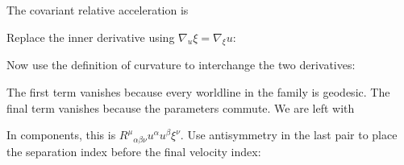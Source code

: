 \documentclass[
  11pt,
  letterpaper,
  oneside,
  openany]{scrbook}
\begin{document}
The covariant relative acceleration is

\begin{center}
\begingroup
{}
\ifdim\wd\grmathbox>\linewidth
\resizebox{\linewidth}{!}{\usebox{\grmathbox}}
\else\usebox{\grmathbox}\fi
\endgroup
\end{center}

Replace the inner derivative using \(\nabla_u\xi=\nabla_\xi u\):

\begin{center}
\begingroup
{}
\ifdim\wd\grmathbox>\linewidth
\resizebox{\linewidth}{!}{\usebox{\grmathbox}}
\else\usebox{\grmathbox}\fi
\endgroup
\end{center}

Now use the definition of curvature to interchange the two derivatives:

\begin{center}
\begingroup
{}
\ifdim\wd\grmathbox>\linewidth
\resizebox{\linewidth}{!}{\usebox{\grmathbox}}
\else\usebox{\grmathbox}\fi
\endgroup
\end{center}

The first term vanishes because every worldline in the family is
geodesic. The final term vanishes because the parameters commute. We are
left with

\begin{center}
\begingroup
{}
\ifdim\wd\grmathbox>\linewidth
\resizebox{\linewidth}{!}{\usebox{\grmathbox}}
\else\usebox{\grmathbox}\fi
\endgroup
\end{center}

In components, this is
\(R^\mu{}_{\alpha\beta\nu}u^\alpha u^\beta\xi^\nu\). Use antisymmetry in
the last pair to place the separation index before the final velocity
index:

\begin{center}
\begingroup
{}
\ifdim\wd\grmathbox>\linewidth
\resizebox{\linewidth}{!}{\usebox{\grmathbox}}
\else\usebox{\grmathbox}\fi
\endgroup
\end{center}
\end{document}
